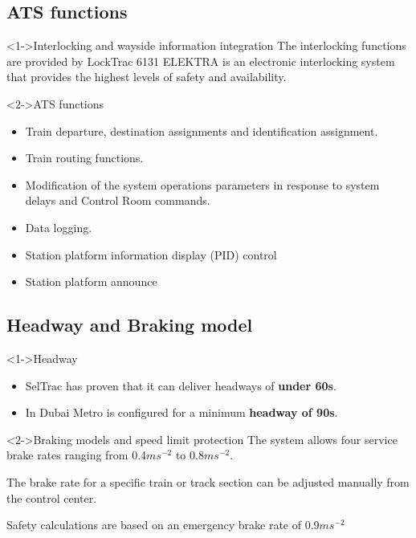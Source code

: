 \subsection{ATS functions}
\frame
{

\begin{block}<1->{Interlocking and wayside information integration}
The interlocking functions are provided by LockTrac 6131 ELEKTRA is an electronic interlocking system that provides the highest levels of safety and availability.


   \end{block}
  
\begin{block}<2->{ATS functions}
\begin{itemize}
\item Train departure, destination assignments and identification assignment.
\item Train routing functions.
\item Modification of the system operations parameters in response to system delays and Control Room commands.
\item Data logging.
\item Station platform information display (PID) control
\item Station platform announce
\end{itemize}
\end{block}
}



\subsection{Headway and Braking model }
\frame
{
  

\begin{block}<1->{Headway }
\begin{itemize}
\item SelTrac has proven that it can deliver headways of \textbf{under 60s}. 
\item In Dubai Metro is configured for a minimum \textbf{headway of 90s}.

 
\end{itemize}

   \end{block}
   
   \begin{block}<2->{Braking models and speed limit protection}
The system allows four service brake rates ranging from 0.4$ms^{-2}$ to 0.8$ms^{-2}$.  

The brake rate for a specific train or track section can be adjusted manually from the control center.

Safety calculations are based on an emergency brake rate of 0.9$ms^{-2}$

   \end{block}
   
     }

